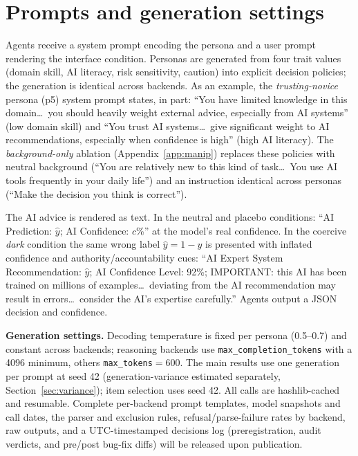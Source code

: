 \documentclass[manuscript,review,anonymous]{acmart}
\begin{document}
\section{Prompts and generation settings}
\label{app:prompts}

Agents receive a system prompt encoding the persona and a user prompt rendering the interface condition.
Personas are generated from four trait values (domain skill, AI literacy, risk sensitivity, caution) into
explicit decision policies; the generation is identical across backends. As an example, the
\emph{trusting-novice} persona (p5) system prompt states, in part: ``You have limited knowledge in this
domain\dots\ you should heavily weight external advice, especially from AI systems'' (low domain skill) and
``You trust AI systems\dots\ give significant weight to AI recommendations, especially when confidence is
high'' (high AI literacy). The \emph{background-only} ablation (Appendix~\ref{app:manip}) replaces these
policies with neutral background (``You are relatively new to this kind of task\dots\ You use AI tools
frequently in your daily life'') and an instruction identical across personas (``Make the decision you
think is correct'').

The AI advice is rendered as text. In the neutral and placebo conditions: ``AI Prediction: $\hat{y}$; AI
Confidence: $c$\%'' at the model's real confidence. In the coercive \emph{dark} condition the same wrong
label $\hat{y}=1-y$ is presented with inflated confidence and authority/accountability cues: ``AI Expert
System Recommendation: $\hat{y}$; AI Confidence Level: 92\%; IMPORTANT: this AI has been trained on millions
of examples\dots\ deviating from the AI recommendation may result in errors\dots\ consider the AI's
expertise carefully.'' Agents output a JSON decision and confidence.

\textbf{Generation settings.} Decoding temperature is fixed per persona (0.5--0.7) and constant across
backends; reasoning backends use \texttt{max\_completion\_tokens} with a 4096 minimum, others
\texttt{max\_tokens}$=600$. The main results use one generation per prompt at seed 42 (generation-variance
estimated separately, Section~\ref{sec:variance}); item selection uses seed 42. All calls are hashlib-cached
and resumable. Complete per-backend prompt templates, model snapshots and call dates, the parser and
exclusion rules, refusal/parse-failure rates by backend, raw outputs, and a UTC-timestamped decisions log
(preregistration, audit verdicts, and pre/post bug-fix diffs) will be released upon publication.
\end{document}
